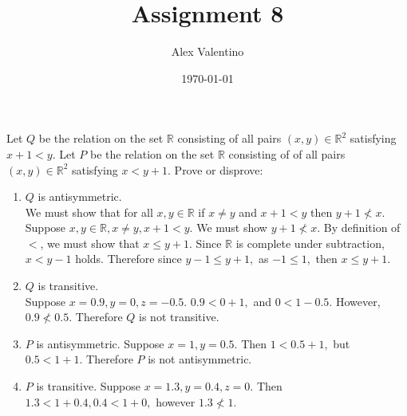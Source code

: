 \documentclass[12pt, letterpaper]{article}
\date{\today}
\author{Alex Valentino}
\title{Assignment 8}
\newcommand{\R}{\mathbb{R}}
\begin{document}
	Let $Q$ be the relation on the set $\mathbb{R}$ consisting
of all pairs $(x,y) \in \mathbb{R}^2$ satisfying $x+1 < y$.
Let $P$ be the relation on the set $\mathbb{R}$ consisting of
of all pairs $(x,y) \in \mathbb{R}^2$ satisfying $x< y+1$.
Prove or disprove:
\begin{enumerate}
\item $Q$ is antisymmetric.\\
	We must show that for all $x,y \in \R$ if $x \neq y$ and $x + 1 < y$ then $y + 1 \nless x.$  Suppose $x,y \in \R, x \neq y, x+1 < y.$  We must show $y+1 \nless x.$  By definition of $<$, we must show that $x \leq y+1.$  Since $\R$ is complete under subtraction, $x <y -1$ holds.  Therefore since $y -1 \leq y + 1,$ as $-1 \leq 1,$ then $x \leq y + 1.$
\item $Q$ is transitive.\\
	Suppose $x=0.9, y = 0, z = -0.5.$  $0.9 < 0+1,$ and $0 < 1-0.5.$  However, $0.9 \nless 0.5.$  Therefore $Q$ is not transitive.
\item $P$ is antisymmetric.
	Suppose $x = 1, y = 0.5.$  Then $1 < 0.5+1,$ but $0.5 < 1 + 1.$  Therefore $P$ is not antisymmetric.
\item $P$ is transitive.
	Suppose $x = 1.3, y = 0.4, z = 0.$  Then $1.3 < 1 + 0.4, 0.4 < 1 + 0,$ however $1.3 \nless 1.$
\end{enumerate}
\end{document}
